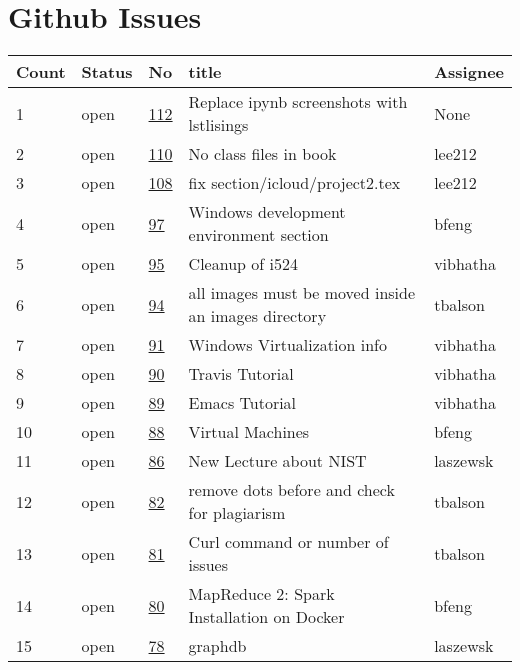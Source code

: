 \section{Github Issues}
\begin{center}
\begin{longtable}{lllll}
Count & Status & No & title & Assignee\\
\hline
1 & open & \href{https://github.com/cloudmesh/book/issues/112}{112} & Replace ipynb screenshots with lstlisings & None\\
2 & open & \href{https://github.com/cloudmesh/book/issues/110}{110} & No class files in book & lee212\\
3 & open & \href{https://github.com/cloudmesh/book/issues/108}{108} & fix section/icloud/project2.tex & lee212\\
4 & open & \href{https://github.com/cloudmesh/book/issues/97}{97} & Windows development environment section & bfeng\\
5 & open & \href{https://github.com/cloudmesh/book/issues/95}{95} & Cleanup of i524  & vibhatha\\
6 & open & \href{https://github.com/cloudmesh/book/issues/94}{94} & all images must be moved inside an images directory & tbalson\\
7 & open & \href{https://github.com/cloudmesh/book/issues/91}{91} & Windows Virtualization info & vibhatha\\
8 & open & \href{https://github.com/cloudmesh/book/issues/90}{90} & Travis Tutorial & vibhatha\\
9 & open & \href{https://github.com/cloudmesh/book/issues/89}{89} & Emacs Tutorial & vibhatha\\
10 & open & \href{https://github.com/cloudmesh/book/issues/88}{88} & Virtual Machines  & bfeng\\
11 & open & \href{https://github.com/cloudmesh/book/issues/86}{86} & New Lecture about NIST & laszewsk\\
12 & open & \href{https://github.com/cloudmesh/book/issues/82}{82} & remove  dots before \cite{} and check for plagiarism & tbalson\\
13 & open & \href{https://github.com/cloudmesh/book/issues/81}{81} & Curl command or number of issues  & tbalson\\
14 & open & \href{https://github.com/cloudmesh/book/issues/80}{80} & MapReduce 2: Spark Installation on Docker  & bfeng\\
15 & open & \href{https://github.com/cloudmesh/book/issues/78}{78} & graphdb & laszewsk\\

\end{longtable}
\end{center}
